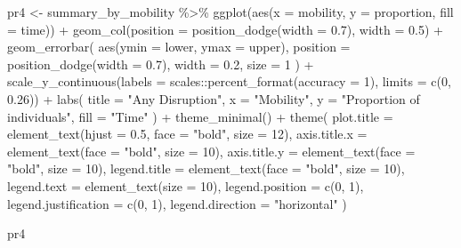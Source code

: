\documentclass[
  letterpaper,
  DIV=11,
  numbers=noendperiod]{scrartcl}
\newenvironment{Shaded}{\begin{snugshade}}{\end{snugshade}}
\newcommand{\AttributeTok}[1]{\textcolor[rgb]{0.40,0.45,0.13}{#1}}
\newcommand{\DecValTok}[1]{\textcolor[rgb]{0.68,0.00,0.00}{#1}}
\newcommand{\FloatTok}[1]{\textcolor[rgb]{0.68,0.00,0.00}{#1}}
\newcommand{\FunctionTok}[1]{\textcolor[rgb]{0.28,0.35,0.67}{#1}}
\newcommand{\NormalTok}[1]{\textcolor[rgb]{0.00,0.23,0.31}{#1}}
\newcommand{\OtherTok}[1]{\textcolor[rgb]{0.00,0.23,0.31}{#1}}
\newcommand{\SpecialCharTok}[1]{\textcolor[rgb]{0.37,0.37,0.37}{#1}}
\newcommand{\StringTok}[1]{\textcolor[rgb]{0.13,0.47,0.30}{#1}}
\begin{document}
\begin{Shaded}
\begin{Highlighting}[]
\NormalTok{pr4 }\OtherTok{\textless{}{-}}\NormalTok{ summary\_by\_mobility }\SpecialCharTok{\%\textgreater{}\%} 
\FunctionTok{ggplot}\NormalTok{(}\FunctionTok{aes}\NormalTok{(}\AttributeTok{x =}\NormalTok{ mobility, }\AttributeTok{y =}\NormalTok{ proportion, }\AttributeTok{fill =}\NormalTok{ time)) }\SpecialCharTok{+}
  \FunctionTok{geom\_col}\NormalTok{(}\AttributeTok{position =} \FunctionTok{position\_dodge}\NormalTok{(}\AttributeTok{width =} \FloatTok{0.7}\NormalTok{), }\AttributeTok{width =} \FloatTok{0.5}\NormalTok{) }\SpecialCharTok{+}
  \FunctionTok{geom\_errorbar}\NormalTok{(}
    \FunctionTok{aes}\NormalTok{(}\AttributeTok{ymin =}\NormalTok{ lower, }\AttributeTok{ymax =}\NormalTok{ upper),}
    \AttributeTok{position =} \FunctionTok{position\_dodge}\NormalTok{(}\AttributeTok{width =} \FloatTok{0.7}\NormalTok{),}
    \AttributeTok{width =} \FloatTok{0.2}\NormalTok{,}
    \AttributeTok{size =} \DecValTok{1}
\NormalTok{  ) }\SpecialCharTok{+}
  \FunctionTok{scale\_y\_continuous}\NormalTok{(}\AttributeTok{labels =}\NormalTok{ scales}\SpecialCharTok{::}\FunctionTok{percent\_format}\NormalTok{(}\AttributeTok{accuracy =} \DecValTok{1}\NormalTok{), }\AttributeTok{limits =} \FunctionTok{c}\NormalTok{(}\DecValTok{0}\NormalTok{, }\FloatTok{0.26}\NormalTok{)) }\SpecialCharTok{+}
  \FunctionTok{labs}\NormalTok{(}
    \AttributeTok{title =} \StringTok{"Any Disruption"}\NormalTok{,}
    \AttributeTok{x =} \StringTok{"Mobility"}\NormalTok{,}
    \AttributeTok{y =} \StringTok{"Proportion of individuals"}\NormalTok{,}
    \AttributeTok{fill =} \StringTok{"Time"}
\NormalTok{  ) }\SpecialCharTok{+}
  \FunctionTok{theme\_minimal}\NormalTok{() }\SpecialCharTok{+}
  \FunctionTok{theme}\NormalTok{(}
    \AttributeTok{plot.title =} \FunctionTok{element\_text}\NormalTok{(}\AttributeTok{hjust =} \FloatTok{0.5}\NormalTok{, }\AttributeTok{face =} \StringTok{"bold"}\NormalTok{, }\AttributeTok{size =} \DecValTok{12}\NormalTok{),}
    \AttributeTok{axis.title.x =} \FunctionTok{element\_text}\NormalTok{(}\AttributeTok{face =} \StringTok{"bold"}\NormalTok{, }\AttributeTok{size =} \DecValTok{10}\NormalTok{),}
    \AttributeTok{axis.title.y =} \FunctionTok{element\_text}\NormalTok{(}\AttributeTok{face =} \StringTok{"bold"}\NormalTok{, }\AttributeTok{size =} \DecValTok{10}\NormalTok{),}
    \AttributeTok{legend.title =} \FunctionTok{element\_text}\NormalTok{(}\AttributeTok{face =} \StringTok{"bold"}\NormalTok{, }\AttributeTok{size =} \DecValTok{10}\NormalTok{),}
    \AttributeTok{legend.text =} \FunctionTok{element\_text}\NormalTok{(}\AttributeTok{size =} \DecValTok{10}\NormalTok{),}
    \AttributeTok{legend.position =} \FunctionTok{c}\NormalTok{(}\DecValTok{0}\NormalTok{, }\DecValTok{1}\NormalTok{), }
    \AttributeTok{legend.justification =} \FunctionTok{c}\NormalTok{(}\DecValTok{0}\NormalTok{, }\DecValTok{1}\NormalTok{),}
    \AttributeTok{legend.direction =} \StringTok{"horizontal"}
\NormalTok{  )}

\NormalTok{pr4}
\end{Highlighting}
\end{Shaded}
\end{document}
